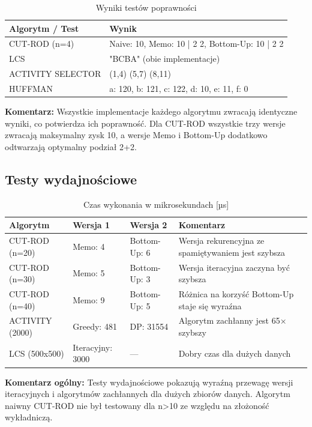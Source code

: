 \documentclass[11pt,a4paper]{article}
\begin{document}
\begin{table}[H]
\centering
\caption{Wyniki testów poprawności}
\begin{tabular}{ll}
\toprule
\textbf{Algorytm / Test} & \textbf{Wynik} \\
\midrule
CUT-ROD (n=4) & Naive: 10, Memo: 10 | 2 2, Bottom-Up: 10 | 2 2 \\
LCS & "BCBA" (obie implementacje) \\
ACTIVITY SELECTOR & (1,4) (5,7) (8,11) \\
HUFFMAN & a: 120, b: 121, c: 122, d: 10, e: 11, f: 0 \\
\bottomrule
\end{tabular}
\end{table}

\textbf{Komentarz:} Wszystkie implementacje każdego algorytmu zwracają identyczne wyniki, co potwierdza ich poprawność. Dla CUT-ROD wszystkie trzy wersje zwracają maksymalny zysk 10, a wersje Memo i Bottom-Up dodatkowo odtwarzają optymalny podział 2+2.

\subsection{Testy wydajnościowe}

\begin{table}[H]
\centering
\caption{Czas wykonania w mikrosekundach [µs]}
\begin{tabular}{llll}
\toprule
\textbf{Algorytm} & \textbf{Wersja 1} & \textbf{Wersja 2} & \textbf{Komentarz} \\
\midrule
CUT-ROD (n=20) & Memo: 4 & Bottom-Up: 6 & Wersja rekurencyjna ze spamiętywaniem jest szybsza \\
CUT-ROD (n=30) & Memo: 5 & Bottom-Up: 3 & Wersja iteracyjna zaczyna być szybsza \\
CUT-ROD (n=40) & Memo: 9 & Bottom-Up: 5 & Różnica na korzyść Bottom-Up staje się wyraźna \\
ACTIVITY (2000) & Greedy: 481 & DP: 31554 & Algorytm zachłanny jest 65× szybszy \\
LCS (500x500) & Iteracyjny: 3000 & --- & Dobry czas dla dużych danych \\
\bottomrule
\end{tabular}
\end{table}

\textbf{Komentarz ogólny:} Testy wydajnościowe pokazują wyraźną przewagę wersji iteracyjnych i algorytmów zachłannych dla dużych zbiorów danych. Algorytm naiwny CUT-ROD nie był testowany dla n>10 ze względu na złożoność wykładniczą.
\end{document}
